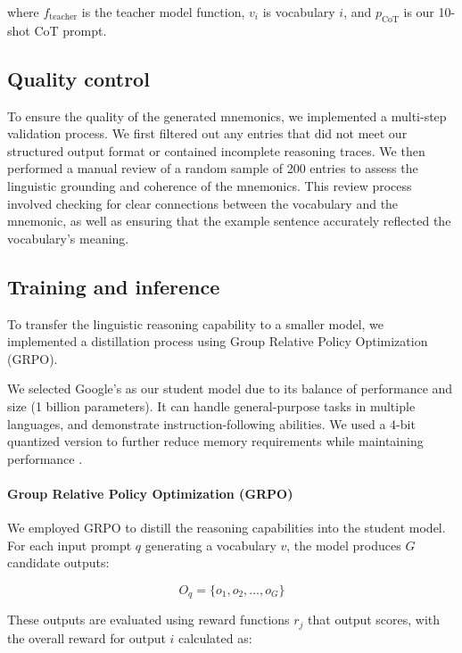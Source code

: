where $f_{\text{teacher}}$ is the teacher model function, $v_i$ is vocabulary $i$, and $p_{\text{CoT}}$ is our 10-shot CoT prompt.

\subsection{Quality control} To ensure the quality of the generated mnemonics, we implemented a multi-step validation process. We first filtered out any entries that did not meet our structured output format or contained incomplete reasoning traces. We then performed a manual review of a random sample of 200 entries to assess the linguistic grounding and coherence of the mnemonics. This review process involved checking for clear connections between the vocabulary and the mnemonic, as well as ensuring that the example sentence accurately reflected the vocabulary's meaning.

\subsection{Training and inference} \label{sec:training-inference}
To transfer the linguistic reasoning capability to a smaller model, we implemented a distillation process using Group Relative Policy Optimization (GRPO).

We selected Google's \studentmodel \citep{GemmaTeamGEMMA2025} as our student model due to its balance of performance and size (1 billion parameters). It can handle general-purpose tasks in multiple languages, and demonstrate instruction-following abilities. We used a 4-bit quantized version to further reduce memory requirements while maintaining performance \citep{dettmersQLoRAEfficientFinetuning2023}.

\paragraph*{Group Relative Policy Optimization (GRPO)} We employed GRPO \citep{DeepSeek-AIDEEPSEEKR12025} to distill the reasoning capabilities into the student model. For each input prompt $q$ generating a vocabulary $v$, the model produces $G$ candidate outputs:

\begin{equation}
O_q = \{o_1, o_2, \ldots, o_G\}
\end{equation}

These outputs are evaluated using reward functions $r_j$ that output scores, with the overall reward for output $i$ calculated as:

